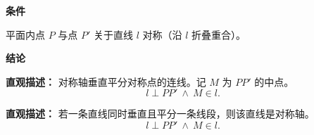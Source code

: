 \begin{statementbox}
	\textbf{\textcolor{CStatement}{条件}}
	\begin{description}[style=nextline, leftmargin=2.8em, labelsep=0.5em, itemsep=0.35em]
		\item[\textbf{\textcolor{CStatement}{条件一（点线对称）}}] 平面内点 $P$ 与点 $P'$ 关于直线 $l$ 对称（沿 $l$ 折叠重合）。
	\end{description}

	\textbf{\textcolor{CStatement}{结论}}
	\begin{description}[style=nextline, leftmargin=2.8em, labelsep=0.5em, itemsep=0.45em]
		\item[\textbf{\textcolor{CStatement}{结论一（中垂线性质）}}]
			\textbf{\textcolor{CStatement}{直观描述：}}
			对称轴垂直平分对称点的连线。记 $M$ 为 $PP'$ 的中点。
			\[
				l \perp PP' \ \land\ M \in l.
			\]

		\item[\textbf{\textcolor{CStatement}{逆命题（等价条件）}}]
			\textbf{\textcolor{CStatement}{直观描述：}}
			若一条直线同时垂直且平分一条线段，则该直线是对称轴。
			\[
				l \perp PP' \ \land\ M \in l.
			\]
	\end{description}
\end{statementbox}
